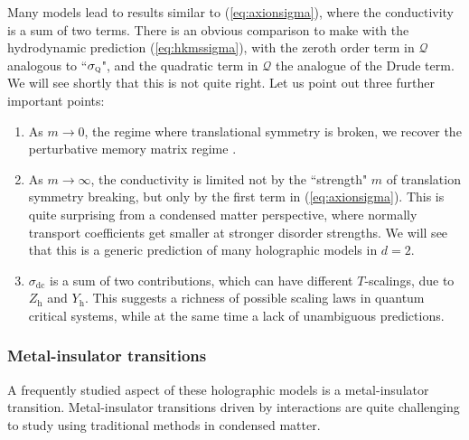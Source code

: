 \documentclass[10pt, oneside]{book}
\begin{document}
\begin{doublespace}
Many models lead to results similar to (\ref{eq:axionsigma}), where the conductivity is a sum of two terms.    There is an obvious comparison to make with the hydrodynamic prediction (\ref{eq:hkmssigma}),  with the zeroth order term in $\mathcal{Q}$ analogous to ``$\sigma_{\textsc{q}}$",  and the quadratic term in $\mathcal{Q}$ the analogue of the Drude term.    We will see shortly that this is not quite right.   Let us point out three further important points:  \begin{enumerate}
\item As $m\rightarrow 0$, the regime where translational symmetry is broken, we recover the perturbative memory matrix regime \cite{Blake:2013owa, lucas1401}.
\item As $m\rightarrow \infty$,  the conductivity is limited not by the ``strength" $m$ of translation symmetry breaking,  but only by the first term in (\ref{eq:axionsigma}).   This is quite surprising from a condensed matter perspective, where normally transport coefficients get smaller at stronger disorder strengths.  We will see that this is a generic prediction of many holographic models in $d=2$.
\item $\sigma_{\mathrm{dc}}$ is a sum of two contributions,  which can have different $T$-scalings,  due to $Z_{\mathrm{h}}$ and $Y_{\mathrm{h}}$.   This suggests a richness of possible scaling laws in quantum critical systems, while at the same time a lack of unambiguous predictions.
\end{enumerate} 


\subsubsection{Metal-insulator transitions}
A frequently studied aspect of these holographic models is a metal-insulator transition.   Metal-insulator transitions driven by interactions are quite challenging to study using traditional methods in condensed matter.   


\end{doublespace}
\end{document}
